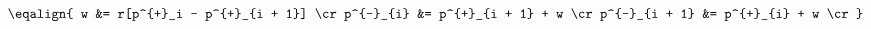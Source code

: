 \hsize 0pt
\vsize 0pt
\nopagenumbers
\overfullrule 0pt
\noindent
$$
\eqalign{
w &= r[p^{+}_i - p^{+}_{i + 1}] \cr
p^{-}_{i} &= p^{+}_{i + 1} + w \cr
p^{-}_{i + 1} &= p^{+}_{i} + w \cr
}
$$
\bye